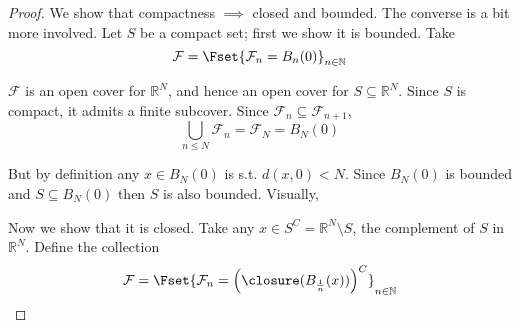 \documentclass{article}
\begin{document}
\begin{proof}
  We show that compactness $\implies$ closed and bounded. The converse is a bit more involved. Let $S$ be a compact set; first we show it is bounded. Take
  \[
    \mathcal{F} = \Fset{\mathcal{F}_n = B_n(0)}_{n \in \mathbb{N}}
  \]

  $\mathcal{F}$ is an open cover for $\mathbb{R}^N$, and hence an open cover for $S \subseteq \mathbb{R}^N$. Since $S$ is compact, it admits a finite subcover. Since $\mathcal{F}_n \subseteq \mathcal{F}_{n + 1}$,
  \[
    \bigcup_{n \le N} \mathcal{F}_n = \mathcal{F}_N = B_N(0)
  \]

  But by definition any $x \in B_N(0)$ is s.t. $d(x, 0) < N$. Since $B_N(0)$ is bounded and $S \subseteq B_N(0)$ then $S$ is also bounded. Visually,
  \begin{figure}[H]
    \centering
  \end{figure}

  Now we show that it is closed. Take any $x \in S^C = \mathbb{R}^N \setminus S$, the complement of $S$ in $\mathbb{R}^N$. Define the collection
  \[
    \mathcal{F} = \Fset{\mathcal{F}_n = \left(\closure(B_{\frac{1}{n}}(x))\right)^C}_{n \in \mathbb{N}}
  \]


\end{proof}
\end{document}
